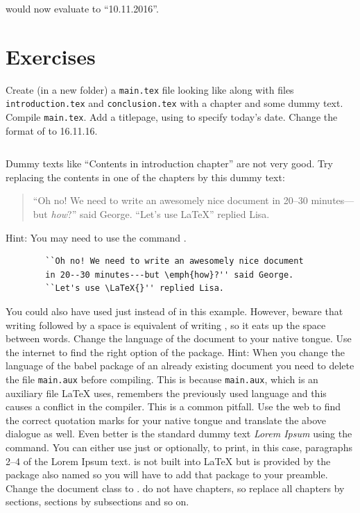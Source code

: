 {\latexone{\renewcommand{\dateseparator}{.}}
\noindent\latexin{\today} would now evaluate to ``10.11.2016''.


\section{Exercises}

\begin{ExerciseList}
	\Exercise Create (in a new folder) a \verb|main.tex| file looking like  along with files \verb|introduction.tex| and \verb|conclusion.tex| with a chapter and some dummy text. Compile \verb|main.tex|.
	\Exercise Add a titlepage, using \latexin{\today} to specify today's date.
	\Exercise Change the format of \latexin{\today} to 16.11.16.
	\Answer ~\\ \inputminted[frame=lines]{latex}{latex/exer_multi.tex}
	\Exercise Dummy texts like ``Contents in introduction chapter'' are not very good. Try replacing the contents in one of the chapters by this dummy text:
	
	\begin{quote}
			``Oh no! We need to write an awesomely nice document in 20--30 minutes---but \emph{how}?'' said George. ``Let's use \LaTeX{}'' replied Lisa.
	\end{quote}
	
	Hint: You may need to use the command \latexin{\LaTeX{}}.
	\Answer ~\\
	\begin{verbatim}
		``Oh no! We need to write an awesomely nice document
		in 20--30 minutes---but \emph{how}?'' said George. 
		``Let's use \LaTeX{}'' replied Lisa.
	\end{verbatim}
	You could also have used just \latexin{\LaTeX} instead of \latexin{\LaTeX{}} in this example. However, beware that writing \latexin{\LaTeX} followed by a space is equivalent of writing \latexin{\LaTeX{ }}, so it eats up the space between words.
	\Exercise Change the language of the document to your native tongue. Use the internet to find the right option of the  package. Hint: When you change the language of the babel package of an already existing document you need to delete the file \verb|main.aux| before compiling. This is because \verb|main.aux|, which is an auxiliary file \LaTeX{} uses, remembers the previously used language and this causes a conflict in the compiler. This is a common pitfall.
	\Exercise Use the web to find the correct quotation marks for your native tongue and translate the above dialogue as well.
	\Exercise Even better is the standard dummy text \emph{Lorem Ipsum} using the \latexin{\lipsum} command. You can either use just \latexin{\lipsum} or optionally, \latexin{\lipsum[2-4]} to print, in this case, paragraphs 2--4 of the Lorem Ipsum text. \latexin{\lipsum} is not built into \LaTeX{} but is provided by the package also named  so you will have to add that package to your preamble.
	\Exercise Change the document class to .  do not have chapters, so replace all chapters by sections, sections by subsections and so on.
\end{ExerciseList}

}
